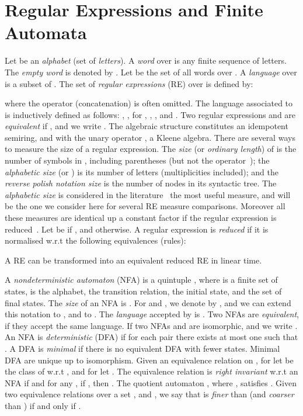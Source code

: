 \documentclass{llncs}
\newcommand{\dfa}{DFA\xspace}
\newcommand{\NFA}{NFA\xspace}
\newcommand{\nfas}{NFAs\xspace}
\newcommand{\re}{RE\xspace}
\begin{document}
\section{Regular Expressions and Finite Automata}
\label{sec:refa}
Let  be an \emph{alphabet}
(set of \emph{letters}). A \emph{word}  over
 is any finite sequence of letters. The \emph{empty word}
is denoted by .  Let  be the set of all
words over . A \emph{language} over  is a subset
of . The set  of \emph{regular expressions} (\re) over
 is defined by:
  
where the operator  (concatenation) is often omitted.
The   language     associated   to     is
inductively   defined    as   follows:   ,
,  for
,
,
,         and
.   Two  regular  expressions
      and            are      \emph{equivalent}      if
,  and  we  write .  The
algebraic  structure  constitutes
an idempotent semiring, and with the unary operator , a Kleene
algebra.  There are  several ways  to measure  the size  of  a regular
expression.  The \emph{size} (or \emph{ordinary length})  of
  is the  number  of symbols  in ,  including
parentheses (but not the operator~); the \emph{alphabetic size}
  (or ) is  its number  of letters
(multiplicities included); and the \emph{reverse polish notation size}
  is the  number of  nodes  in its  syntactic tree.  The
\emph{alphabetic       size}      is      considered       in      the
literature~\cite{ellul05:_regul_expres}  the most useful  measure, and
will be the one we  consider here for several \re measure comparisons.
Moreover all these measures are  identical up a constant factor if the
regular  expression is  reduced~\cite  [Th. 3]{ellul05:_regul_expres}.
Let      be     if   ,  and     otherwise.  A  regular  expression
  is \emph{reduced} if  it is  normalised w.r.t  the following
equivalences (rules):

\noindent A \re can be transformed into an equivalent reduced \re in
linear time.

A \emph{nondeterministic automaton} (\NFA)  is a quintuple
, where  is a finite set of states,
 is the alphabet,  the transition relation,  the initial state, and  the set of final states. The \emph{size} of an \NFA is
. For  and , we denote by
, and we can
extend this notation to , and to .
The \emph{language} accepted by  is . Two \nfas
are \emph{equivalent}, if they accept the same language.  If two \nfas
 and  are isomorphic, and we write .  An \NFA is
\emph{deterministic} (\dfa) if for each pair  there exists at most one  such that .
A \dfa is \emph{minimal} if there is no equivalent \dfa with fewer
states. Minimal \dfa are unique up to isomorphism.  Given an
equivalence relation  on , for  let  be the
class of  w.r.t , and for  let
.  The equivalence relation  is
\emph{right invariant} w.r.t an \NFA  if  and for any ,  if , then . The quotient
automaton , where
,
satisfies . Given two equivalence
relations over a set ,  and , we say that  is \emph{finer}
than  (and  \emph{coarser} than ) if and only if .
\end{document}
